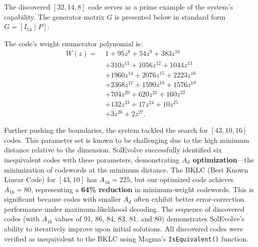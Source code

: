 The discovered $[32,14,8]$ code serves as a prime example of the system's capability. The generator matrix $G$ is presented below in standard form $G = [I_{14} \mid P]$:
\begin{center}
\end{center}
The code's weight enumerator polynomial is:
\begin{align*}
W(z) =\; & 1 + 95z^8 + 54z^9 + 383z^{10} \\
&+ 310z^{11} + 1056z^{12} + 1044z^{13} \\
&+ 1960z^{14} + 2076z^{15} + 2223z^{16} \\
&+ 2368z^{17} + 1590z^{18} + 1576z^{19} \\
&+ 704z^{20} + 620z^{21} + 160z^{22} \\
&+ 132z^{23} + 17z^{24} + 10z^{25} \\
&+ 3z^{26} + 2z^{27}.
\end{align*}

Further pushing the boundaries, the system tackled the search for $[43,10,16]$ codes. This parameter set is known to be challenging due to the high minimum distance relative to the dimension. SolEvolve successfully identified six inequivalent codes with these parameters, demonstrating \textbf{$A_d$ optimization}---the minimization of codewords at the minimum distance. The BKLC (Best Known Linear Code) for $[43,10]$ has $A_{16} = 225$, but our optimized code achieves $A_{16} = 80$, representing a \textbf{64\% reduction} in minimum-weight codewords. This is significant because codes with smaller $A_d$ often exhibit better error-correction performance under maximum-likelihood decoding. The sequence of discovered codes (with $A_{16}$ values of 91, 86, 84, 83, 81, and 80) demonstrates SolEvolve's ability to iteratively improve upon initial solutions. All discovered codes were verified as inequivalent to the BKLC using Magma's \texttt{IsEquivalent()} function.

